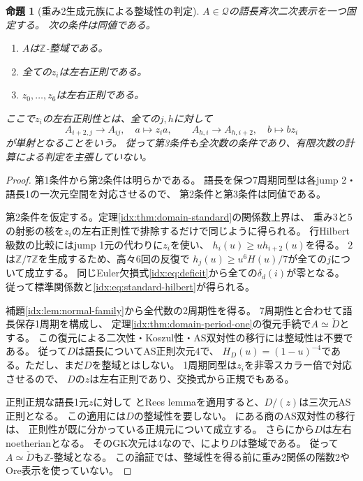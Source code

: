 \documentclass[11pt,a4paper]{ltjsarticle}
\newtheorem{proposition}[theorem]{命題}
\theoremstyle{definition}
\begin{document}
\begin{proposition}[重み2生成元族による整域性の判定]\label{idx:prop:z-regular-criterion}
$A\in\mathcal Q$の語長斉次二次表示を一つ固定する。
次の条件は同値である。
\begin{enumerate}
\item $A$は$\mathbb Z$-整域である。
\item 全ての$z_i$は左右正則である。
\item $z_0,\ldots,z_6$は左右正則である。
\end{enumerate}
ここで$z_i$の左右正則性とは、全ての$j,h$に対して
\[
A_{i+2,j}\longrightarrow A_{ij},\quad a\longmapsto z_i a,
\qquad
A_{h,i}\longrightarrow A_{h,i+2},\quad b\longmapsto b z_i
\]
が単射となることをいう。
従って第3条件も全次数の条件であり、有限次数の計算による判定を主張していない。
\end{proposition}
\begin{proof}
第1条件から第2条件は明らかである。
語長を保つ7周期同型は各jump 2・語長1の一次元空間を対応させるので、
第2条件と第3条件は同値である。

第2条件を仮定する。定理\ref{idx:thm:domain-standard}の関係数上界は、
重み3と5の射影の核を$z_i$の左右正則性で排除するだけで同じように得られる。
行Hilbert級数の比較にはjump 1元の代わりに$z_i$を使い、
$h_i(u)\ge u h_{i+2}(u)$を得る。
$2$は$\mathbb Z/7\mathbb Z$を生成するため、高々6回の反復で
$h_j(u)\ge u^6H(u)/7$が全ての$j$について成立する。
同じEuler欠損式\eqref{idx:eq:deficit}から全ての$\delta_d(i)$が零となる。
従って標準関係数と\eqref{idx:eq:standard-hilbert}が得られる。

補題\ref{idx:lem:normal-family}から全代数の2周期性を得る。
7周期性と合わせて語長保存1周期を構成し、
定理\ref{idx:thm:domain-period-one}の復元手続で$A\simeq\check D$とする。
この復元による二次性・Koszul性・AS双対性の移行には整域性は不要である。
従って$D$は語長についてAS正則次元4で、
$H_D(u)=(1-u)^{-4}$である。ただし、まだ$D$を整域とはしない。
1周期同型は$z_i$を非零スカラー倍で対応させるので、
$D$の$z$は左右正則であり、交換式から正規でもある。

正則正規な語長1元$z$に対して
\cite[Lemma 1.1]{RZ}とRees lemmaを適用すると、$D/(z)$は三次元AS正則となる。
この適用には$D$の整域性を要しない。
\cite[Corollary 1.2の証明]{RZ}にある商のAS双対性の移行は、
正則性が既に分かっている正規元について成立する。
さらに\cite[Lemma 1.3(c)]{RZ}から$D$は左右noetherianとなる。
そのGK次元は4なので、\cite[Lemma 1.3]{LPWZ}により$D$は整域である。
従って$A\simeq\check D$も$\mathbb Z$-整域となる。
この論証では、整域性を得る前に重み2関係の階数2やOre表示を使っていない。
\end{proof}
\end{document}
